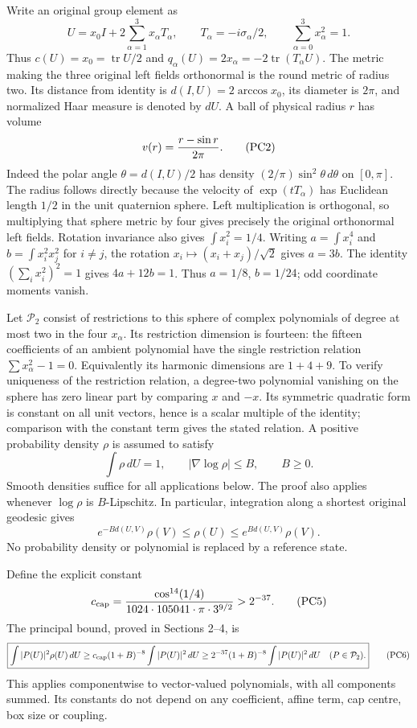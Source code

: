 \documentclass[11pt]{article}
\begin{document}
Write an original group element as
\[
 U=x_0I+2\sum_{\alpha=1}^3x_\alpha T_\alpha,\qquad
 T_\alpha=-i\sigma_\alpha/2,\qquad
 \sum_{\alpha=0}^3x_\alpha^2=1 .
 \tag{PC1}
\]
Thus \(c(U)=x_0=\operatorname{tr}U/2\) and
\(q_\alpha(U)=2x_\alpha=-2\operatorname{tr}(T_\alpha U)\).
The metric making the three original left fields orthonormal is the
round metric of radius two. Its distance from identity is
\(d(I,U)=2\arccos x_0\), its diameter is \(2\pi\), and normalized Haar
measure is denoted by \(dU\). A ball of physical radius \(r\) has volume
\[
 v(r)={r-\sin r\over2\pi}.
 \tag{PC2}
\]
Indeed the polar angle \(\theta=d(I,U)/2\) has density
\((2/\pi)\sin^2\theta\,d\theta\) on \([0,\pi]\).
The radius follows directly because the velocity of \(\exp(tT_\alpha)\)
has Euclidean length \(1/2\) in the unit quaternion sphere. Left
multiplication is orthogonal, so multiplying that sphere metric by
four gives precisely the original orthonormal left fields.
Rotation invariance also gives \(\int x_i^2=1/4\).
Writing \(a=\int x_i^4\) and \(b=\int x_i^2x_j^2\) for \(i\ne j\),
the rotation \(x_i\mapsto(x_i+x_j)/\sqrt2\) gives \(a=3b\).
The identity \((\sum_i x_i^2)^2=1\) gives \(4a+12b=1\).
Thus \(a=1/8\), \(b=1/24\); odd coordinate moments vanish.

Let \(\mathcal P_2\) consist of restrictions to this sphere of complex
polynomials of degree at most two in the four \(x_\alpha\).
Its restriction dimension is fourteen: the fifteen coefficients of an ambient
polynomial have the single restriction relation
\(\sum x_\alpha^2-1=0\). Equivalently its harmonic dimensions are
\(1+4+9\). To verify uniqueness of the restriction relation,
a degree-two polynomial vanishing on the sphere has zero linear
part by comparing \(x\) and \(-x\). Its symmetric quadratic form
is constant on all unit vectors, hence is a scalar multiple of the
identity; comparison with the constant term gives the stated relation.
A positive probability density \(\rho\) is assumed to satisfy
\[
 \int\rho\,dU=1,\qquad
 |\nabla\log\rho|\le B,\qquad B\ge0.
 \tag{PC3}
\]
Smooth densities suffice for all applications below. The proof also
applies whenever \(\log\rho\) is \(B\)-Lipschitz. In particular,
integration along a shortest original geodesic gives
\[
 e^{-Bd(U,V)}\rho(V)\le\rho(U)\le e^{Bd(U,V)}\rho(V).
 \tag{PC4}
\]
No probability density or polynomial is replaced by a reference state.

Define the explicit constant
\[
 c_{\rm cap}
 ={ \cos^{14}(1/4)\over1024\cdot105041\cdot\pi\cdot3^{9/2}}
 >2^{-37}.
 \tag{PC5}
\]
The principal bound, proved in Sections 2–4, is
\[
 \boxed{\displaystyle
 \int|P(U)|^2\rho(U)\,dU
 \ge c_{\rm cap}(1+B)^{-8}\int|P(U)|^2\,dU
 \ge2^{-37}(1+B)^{-8}\int|P(U)|^2\,dU
 \quad(P\in\mathcal P_2).}
 \tag{PC6}
\]
This applies componentwise to vector-valued polynomials, with all
components summed. Its constants do not depend on any coefficient,
affine term, cap centre, box size or coupling.
\end{document}
